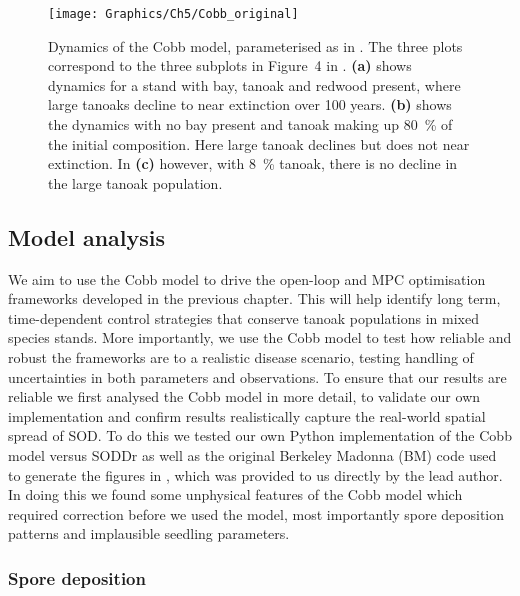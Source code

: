\begin{figure}[t]
    \begin{center}
        \texttt{[image: Graphics/Ch5/Cobb\_original]}
        \caption[Mixed stand model baseline dynamics]{Dynamics of the Cobb model, parameterised as in \citet{cobb_ecosystem_2012}. The three plots correspond to the three subplots in Figure~4 in \citet{cobb_ecosystem_2012}. \textbf{(a)} shows dynamics for a stand with bay, tanoak and redwood present, where large tanoaks decline to near extinction over 100 years. \textbf{(b)} shows the dynamics with no bay present and tanoak making up \SI{80}{\percent} of the initial composition. Here large tanoak declines but does not near extinction. In \textbf{(c)} however, with \SI{8}{\percent} tanoak, there is no decline in the large tanoak population.\label{fig:ch5:cobb_host_change}}
    \end{center}
\end{figure}

\subsection{Model analysis\label{sec:ch5:model_analysis}}

We aim to use the Cobb model to drive the open-loop and MPC optimisation frameworks developed in the previous chapter. This will help identify long term, time-dependent control strategies that conserve tanoak populations in mixed species stands. More importantly, we use the Cobb model to test how reliable and robust the frameworks are to a realistic disease scenario, testing handling of uncertainties in both parameters and observations. To ensure that our results are reliable we first analysed the Cobb model in more detail, to validate our own implementation and confirm results realistically capture the real-world spatial spread of SOD\@. To do this we tested our own Python implementation of the Cobb model versus SODDr as well as the original Berkeley Madonna (BM) code used to generate the figures in \citet{cobb_ecosystem_2012}, which was provided to us directly by the lead author. In doing this we found some unphysical features of the Cobb model which required correction before we used the model, most importantly spore deposition patterns and implausible seedling parameters.

\subsubsection{Spore deposition}

